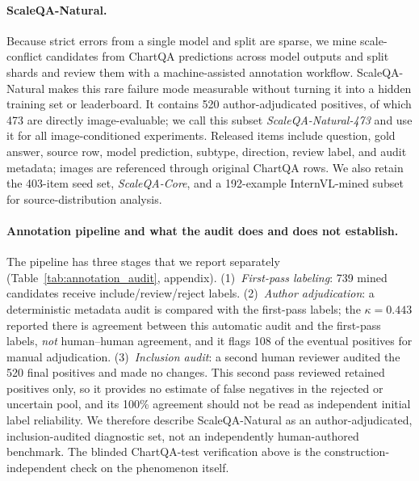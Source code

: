 \paragraph{ScaleQA-Natural.}
Because strict errors from a single model and split are sparse, we mine scale-conflict candidates from ChartQA predictions across model outputs and split shards and review them with a machine-assisted annotation workflow. ScaleQA-Natural makes this rare failure mode measurable without turning it into a hidden training set or leaderboard. It contains 520 author-adjudicated positives, of which 473 are directly image-evaluable; we call this subset \emph{ScaleQA-Natural-473} and use it for all image-conditioned experiments. Released items include question, gold answer, source row, model prediction, subtype, direction, review label, and audit metadata; images are referenced through original ChartQA rows. We also retain the 403-item seed set, \emph{ScaleQA-Core}, and a 192-example InternVL-mined subset for source-distribution analysis.


\paragraph{Annotation pipeline and what the audit does and does not establish.}
The pipeline has three stages that we report separately (Table~\ref{tab:annotation_audit}, appendix). (1)~\emph{First-pass labeling}: 739 mined candidates receive include/review/reject labels. (2)~\emph{Author adjudication}: a deterministic metadata audit is compared with the first-pass labels; the $\kappa=0.443$ reported there is agreement between this automatic audit and the first-pass labels, \emph{not} human--human agreement, and it flags 108 of the eventual positives for manual adjudication. (3)~\emph{Inclusion audit}: a second human reviewer audited the 520 final positives and made no changes. This second pass reviewed retained positives only, so it provides no estimate of false negatives in the rejected or uncertain pool, and its 100\% agreement should not be read as independent initial label reliability. We therefore describe ScaleQA-Natural as an author-adjudicated, inclusion-audited diagnostic set, not an independently human-authored benchmark. The blinded ChartQA-test verification above is the construction-independent check on the phenomenon itself.


